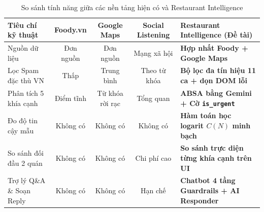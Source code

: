 \begin{table}[H]
\centering
\caption{So sánh tính năng giữa các nền tảng hiện có và Restaurant Intelligence}
\label{tab:comparison}
\vspace{0.15cm}
\footnotesize
\begin{tabularx}{\textwidth}{l c c c X}
\toprule
\rowcolor{blue!8}
\textbf{Tiêu chí kỹ thuật} & \textbf{Foody.vn} & \textbf{Google Maps} & \textbf{Social Listening} & \textbf{Restaurant Intelligence (Đề tài)} \\
\midrule
Nguồn dữ liệu & Đơn nguồn & Đơn nguồn & Mạng xã hội & \textbf{Hợp nhất Foody + Google Maps} \\
Lọc Spam đặc thù VN & Thấp & Trung bình & Theo từ khóa & \textbf{Bộ lọc đa tín hiệu 11 ca + dọn DOM lỗi} \\
Phân tích 5 khía cạnh & Điểm tĩnh & Từ khóa rời rạc & Tổng quan & \textbf{ABSA bằng Gemini + Cờ \texttt{is\_urgent}} \\
Đo độ tin cậy mẫu & Không có & Không có & Không có & \textbf{Hàm toán học logarit $C(N)$ minh bạch} \\
So sánh đối đầu 2 quán & Không có & Không có & Chi phí cao & \textbf{So sánh trực diện từng khía cạnh trên UI} \\
Trợ lý Q\&A \& Soạn Reply & Không có & Không có & Hạn chế & \textbf{Chatbot 4 tầng Guardrails + AI Responder} \\
\bottomrule
\end{tabularx}
\end{table}

